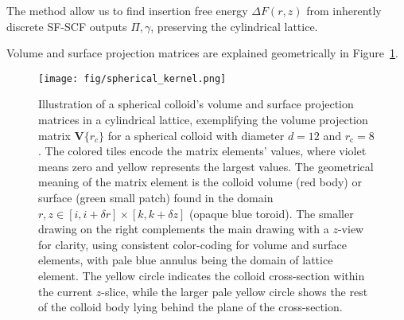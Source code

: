 \documentclass[10pt, a4paper, twocolumn]{article}
\begin{document}
The method allow us to find insertion free energy $\Delta F(r,z)$ from inherently discrete SF-SCF outputs $\Pi, \gamma$, preserving the cylindrical lattice.

Volume and surface projection matrices are explained geometrically in Figure~\ref{fig:spherical_kernel}.

\begin{figure}[H]
    \centering
    \texttt{[image: fig/spherical\_kernel.png]}
    \caption{
        Illustration of a spherical colloid's volume and surface projection matrices in a cylindrical lattice, exemplifying the volume projection matrix $\bm{V}\{r_c\}$ for a spherical colloid with diameter $d = 12$ and $r_{\text{c}}= 8$.
        The colored tiles encode the matrix elements' values, where violet means zero and yellow represents the largest values.
        The geometrical meaning of the matrix element is the colloid volume (red body) or surface (green small patch) found in the domain $r,z \in [i, i + \delta r] \times [k, k + \delta z]$ (opaque blue toroid).
        The smaller drawing on the right complements the main drawing with a $z$-view for clarity, using consistent color-coding for volume and surface elements, with pale blue annulus being the domain of lattice element.
        The yellow circle indicates the colloid cross-section within the current $z$-slice, while the larger pale yellow circle shows the rest of the colloid body lying behind the plane of the cross-section.
    }
    \label{fig:spherical_kernel}
\end{figure}




\end{document}
